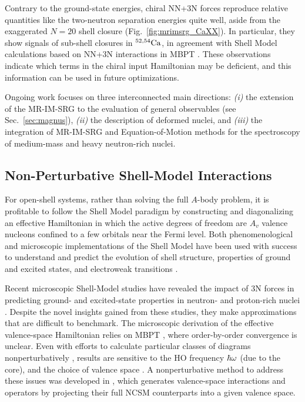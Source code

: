 Contrary to the ground-state energies, chiral NN+3N forces reproduce
relative quantities like the two-neutron separation energies quite
well, aside from the exaggerated $N=20$ shell closure
(Fig.~\ref{fig:mrimsrg_CaXX}).  In particular, they show signals of
sub-shell closures in $\nuc{Ca}{52,54}$, in agreement with
Shell Model calculations based on NN+3N interactions in MBPT
\cite{Holt:2014vn,Wienholtz:2013bh}. These observations indicate which
terms in the chiral input Hamiltonian may be deficient, and this
information can be used in future optimizations.

Ongoing work focuses on three interconnected main directions:
\emph{(i)} the extension of the MR-IM-SRG to the evaluation of general
observables (see Sec.~\ref{sec:magnus}), \emph{(ii)} the description
of deformed nuclei, and \emph{(iii)} the integration of MR-IM-SRG and
Equation-of-Motion methods \cite{Rowe:1968eq} for the spectroscopy of
medium-mass and heavy neutron-rich nuclei.

\subsection{Non-Perturbative Shell-Model Interactions}
\label{sec:shell_model}

For open-shell systems, rather than solving the full $A$-body problem,
it is profitable to follow the Shell Model paradigm by constructing
and diagonalizing an effective Hamiltonian in which the active degrees
of freedom are $A_v$ valence nucleons confined to a few orbitals near
the Fermi level. Both phenomenological and microscopic
implementations of the Shell Model have been used with success to
understand and predict the evolution of shell structure, properties of
ground and excited states, and electroweak transitions
\cite{Brown:2001rg,Caurier:2005qf,Otsuka:2013vn}.

Recent microscopic Shell-Model studies have revealed the impact of 3N
forces in predicting ground- and excited-state properties in neutron-
and proton-rich nuclei
\cite{Otsuka:2010cr,Holt:2012fk,Holt:2013fk,Holt:2013hc,Holt:2013cr,Gallant:2012kx,Wienholtz:2013bh,Holt:2014vn}.
Despite the novel insights gained from these studies, they make
approximations that are difficult to benchmark. The microscopic
derivation of the effective valence-space Hamiltonian relies on MBPT
\cite{Hjorth-Jensen:1995ys}, where order-by-order convergence is unclear. Even with
efforts to calculate particular classes of diagrams nonperturbatively
\cite{Holt:2005mi}, results are sensitive to the HO frequency $\hw$ (due
to the core), and the choice of valence space
\cite{Holt:2012fk,Holt:2013fk,Holt:2013hc}. A nonperturbative method to
address these issues was developed in
\cite{Lisetskiy:2008fk,Lisetskiy:2009uq,Dikmen:2015fk}, which generates valence-space
interactions and operators by projecting their full NCSM counterparts
into a given valence space.

